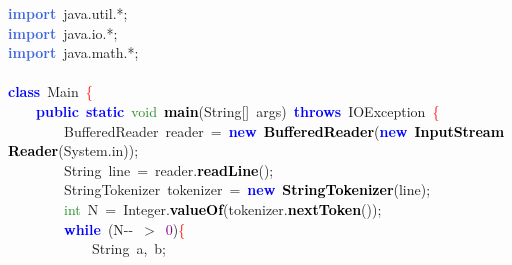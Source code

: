 
{\ttfamily \raggedright {
\noindent
\mbox{}\textbf{\textcolor{RoyalBlue}{import}}\ java\textcolor{BrickRed}{.}util\textcolor{BrickRed}{.*;} \\
\mbox{}\textbf{\textcolor{RoyalBlue}{import}}\ java\textcolor{BrickRed}{.}io\textcolor{BrickRed}{.*;} \\
\mbox{}\textbf{\textcolor{RoyalBlue}{import}}\ java\textcolor{BrickRed}{.}math\textcolor{BrickRed}{.*;} \\
\mbox{}\  \\
\mbox{}\textbf{\textcolor{Blue}{class}}\ Main\ \textcolor{Red}{\{} \\
\mbox{}\ \ \ \ \textbf{\textcolor{Blue}{public}}\ \textbf{\textcolor{Blue}{static}}\ \textcolor{ForestGreen}{void}\ \textbf{\textcolor{Black}{main}}\textcolor{BrickRed}{(}String\textcolor{BrickRed}{[]}\ args\textcolor{BrickRed}{)}\ \textbf{\textcolor{Blue}{throws}}\ IOException\ \textcolor{Red}{\{} \\
\mbox{}\ \ \ \ \ \ \ \ BufferedReader\ reader\ \textcolor{BrickRed}{=}\ \textbf{\textcolor{Blue}{new}}\ \textbf{\textcolor{Black}{BufferedReader}}\textcolor{BrickRed}{(}\textbf{\textcolor{Blue}{new}}\ \textbf{\textcolor{Black}{InputStreamReader}}\textcolor{BrickRed}{(}System\textcolor{BrickRed}{.}in\textcolor{BrickRed}{));} \\
\mbox{}\ \ \ \ \ \ \ \ String\ line\ \textcolor{BrickRed}{=}\ reader\textcolor{BrickRed}{.}\textbf{\textcolor{Black}{readLine}}\textcolor{BrickRed}{();} \\
\mbox{}\ \ \ \ \ \ \ \ StringTokenizer\ tokenizer\ \textcolor{BrickRed}{=}\ \textbf{\textcolor{Blue}{new}}\ \textbf{\textcolor{Black}{StringTokenizer}}\textcolor{BrickRed}{(}line\textcolor{BrickRed}{);} \\
\mbox{}\ \ \ \ \ \ \ \ \textcolor{ForestGreen}{int}\ N\ \textcolor{BrickRed}{=}\ Integer\textcolor{BrickRed}{.}\textbf{\textcolor{Black}{valueOf}}\textcolor{BrickRed}{(}tokenizer\textcolor{BrickRed}{.}\textbf{\textcolor{Black}{nextToken}}\textcolor{BrickRed}{());} \\
\mbox{}\ \ \ \ \ \ \ \ \textbf{\textcolor{Blue}{while}}\ \textcolor{BrickRed}{(}N\textcolor{BrickRed}{-\/-}\ \textcolor{BrickRed}{$>$}\ \textcolor{Purple}{0}\textcolor{BrickRed}{)}\textcolor{Red}{\{} \\
\mbox{}\ \ \ \ \ \ \ \ \ \ \ \ String\ a\textcolor{BrickRed}{,}\ b\textcolor{BrickRed}{;} \\
}}
